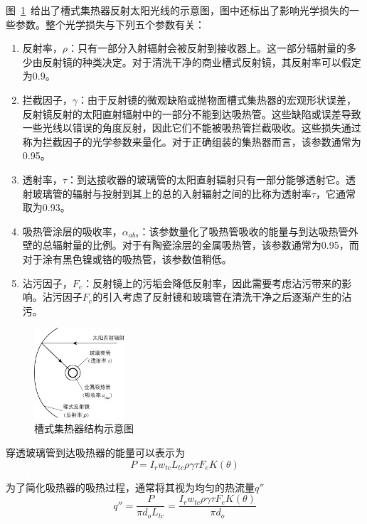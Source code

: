 图~\ref{fig:ParabolicTrough}~给出了槽式集热器反射太阳光线的示意图，图中还标出了影响光学损失的一些参数。整个光学损失与下列五个参数有关：

\begin{enumerate}[label=(\arabic*)]
  \item 反射率，$\rho$：只有一部分入射辐射会被反射到接收器上。这一部分辐射量的多少由反射镜的种类决定。对于清洗干净的商业槽式反射镜，其反射率可以假定为0.9。
  \item 拦截因子，$\gamma$：由于反射镜的微观缺陷或抛物面槽式集热器的宏观形状误差，反射镜反射的太阳直射辐射中的一部分不能到达吸热管。这些缺陷或误差导致一些光线以错误的角度反射，因此它们不能被吸热管拦截吸收。这些损失通过称为拦截因子的光学参数来量化。对于正确组装的集热器而言，该参数通常为0.95。
  \item 透射率，$\tau$：到达接收器的玻璃管的太阳直射辐射只有一部分能够透射它。透射玻璃管的辐射与投射到其上的总的入射辐射之间的比称为透射率$\tau$，它通常取为0.93。
  \item 吸热管涂层的吸收率，$\alpha_{abs}$：该参数量化了吸热管吸收的能量与到达吸热管外壁的总辐射量的比例。对于有陶瓷涂层的金属吸热管，该参数通常为0.95，而对于涂有黑色镍或铬的吸热管，该参数值稍低。
  \item 沾污因子，$F_e$：反射镜上的污垢会降低反射率，因此需要考虑沾污带来的影响。沾污因子$F_e$的引入考虑了反射镜和玻璃管在清洗干净之后逐渐产生的沾污。
\end{enumerate}

\begin{figure}[!ht]
\centering
\includegraphics[width=0.3\textwidth]{fig/ParametersOfParabolicDish.pdf}
\caption{槽式集热器结构示意图}\label{fig:ParabolicTrough}
\end{figure}

穿透玻璃管到达吸热器的能量可以表示为
\begin{equation}
  P = I_r w_{tc} L_{tc} \rho \gamma \tau F_e K(\theta)
\end{equation}

为了简化吸热器的吸热过程，通常将其视为均匀的热流量$q''$
\begin{equation}
  q''= \frac{P}{\pi d_o L_{tc}} = \frac{I_r w_{tc} \rho \gamma \tau F_e K(\theta)}{\pi d_o}
\end{equation}

